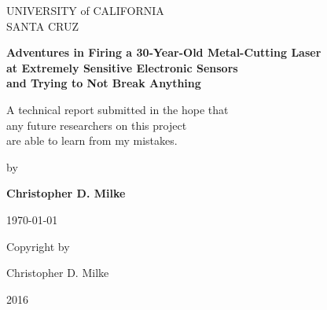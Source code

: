 \documentclass{report}
\begin{document}
	\begin{titlepage} \begin{singlespace}
        \begin{center} \begin{large}
            UNIVERSITY of CALIFORNIA \\ SANTA CRUZ

            \vspace{\baselineskip}

            \textbf{Adventures in Firing a 30-Year-Old Metal-Cutting Laser \\ at Extremely Sensitive Electronic Sensors \\ and Trying to Not Break Anything}

            \vspace{\baselineskip}

            A technical report submitted in the hope that \\ any future researchers on this project \\
            are able to learn from my mistakes.

            \vspace{\baselineskip}

            by

            \vspace{\baselineskip}

            \textbf{Christopher D. Milke}

            \vspace{\baselineskip}

            \today

            \vspace*{\fill}

            \end{large}
        \end{center}

	\end{singlespace} \end{titlepage}


    \newpage \begin{center} 
        \vspace*{\fill}
        Copyright \textcopyright by

        Christopher D. Milke 

        2016
        \vspace*{\fill}
    \end{center} \newpage
\end{document}
